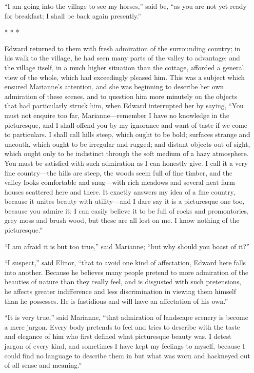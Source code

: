 ``I am going into the village to see my horses,''
said be, ``as you are not yet ready for breakfast; I shall
be back again presently.''

\begin{center}* * *\end{center}

Edward returned to them with fresh admiration
of the surrounding country; in his walk to the village,
he had seen many parts of the valley to advantage;
and the village itself, in a much higher situation than
the cottage, afforded a general view of the whole, which had
exceedingly pleased him.  This was a subject which ensured
Marianne's attention, and she was beginning to describe
her own admiration of these scenes, and to question him more
minutely on the objects that had particularly struck him,
when Edward interrupted her by saying, ``You must not
enquire too far, Marianne---remember I have no knowledge
in the picturesque, and I shall offend you by my ignorance
and want of taste if we come to particulars.  I shall call
hills steep, which ought to be bold; surfaces strange
and uncouth, which ought to be irregular and rugged;
and distant objects out of sight, which ought only to be
indistinct through the soft medium of a hazy atmosphere.
You must be satisfied with such admiration as I can
honestly give.  I call it a very fine country---the
hills are steep, the woods seem full of fine timber,
and the valley looks comfortable and snug---with rich
meadows and several neat farm houses scattered here
and there.  It exactly answers my idea of a fine country,
because it unites beauty with utility---and I dare say it
is a picturesque one too, because you admire it; I can
easily believe it to be full of rocks and promontories,
grey moss and brush wood, but these are all lost on me.
I know nothing of the picturesque.''

``I am afraid it is but too true,'' said Marianne;
``but why should you boast of it?''

``I suspect,'' said Elinor, ``that to avoid one kind
of affectation, Edward here falls into another.  Because he
believes many people pretend to more admiration of the beauties
of nature than they really feel, and is disgusted with
such pretensions, he affects greater indifference and less
discrimination in viewing them himself than he possesses.
He is fastidious and will have an affectation of his own.''

``It is very true,'' said Marianne, ``that admiration
of landscape scenery is become a mere jargon.
Every body pretends to feel and tries to describe with
the taste and elegance of him who first defined what
picturesque beauty was.  I detest jargon of every kind,
and sometimes I have kept my feelings to myself,
because I could find no language to describe them
in but what was worn and hackneyed out of all sense and meaning.''

